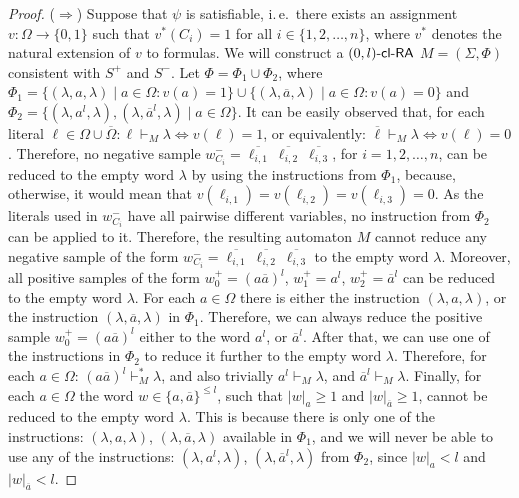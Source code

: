 \begin{proof}
($\Rightarrow$)
Suppose that $\psi$ is satisfiable, i.\,e.\ there exists an assignment $v: \Omega \to \{0, 1\}$ such that $v^*(C_i) = 1$ for all $i \in \{1, 2, \ldots, n\}$, where $v^*$ denotes the natural extension of $v$ to formulas. We will construct a $\textup{\sf $(0,l)$-\textup{\sf cl-RA\/}}$ $M = (\Sigma, \Phi)$ consistent with $S^+$ and $S^-$. Let $\Phi=\Phi_1 \cup \Phi_2$, where $\Phi_1 = \{ (\lambda, a, \lambda) \mid a \in \Omega: v(a) = 1 \} \cup \{ (\lambda, \overline{a}, \lambda) \mid a \in \Omega: v(a) = 0 \}$ and $\Phi_2 = \{ (\lambda, a^l, \lambda), (\lambda, \overline{a}^l, \lambda) \mid a \in \Omega \}$. It can be easily observed that, for each literal $\ell \in \Omega \cup \overline{\Omega}: \ell \vdash_M \lambda \Leftrightarrow v(\ell) = 1$, or equivalently: $\overline{\ell} \vdash_M \lambda \Leftrightarrow v(\ell) = 0$. Therefore, no negative sample $w_{C_i}^- = \overline{\ell_{i,1}}\ \overline{\ell_{i,2}}\ \overline{\ell_{i,3}}$, for $i = 1, 2, \ldots, n$, can be reduced to the empty word $\lambda$ by using the instructions from $\Phi_1$, because, otherwise, it would mean that $v(\ell_{i,1}) = v(\ell_{i,2}) = v(\ell_{i,3}) = 0$. As the literals used in $w_{C_i}^-$ have all pairwise different variables, no instruction from $\Phi_2$ can be applied to it. Therefore, the resulting automaton $M$ cannot reduce any negative sample of the form  $w_{C_i}^- = \overline{\ell_{i,1}}\ \overline{\ell_{i,2}}\ \overline{\ell_{i,3}}$ to the empty word $\lambda$. Moreover, all positive samples of the form $w_0^+ = (a \overline{a})^l$,  $w_1^+ = a^l$, $w_2^+ = \overline{a}^l$ can be reduced to the empty word $\lambda$. For each $a \in \Omega$ there is either the instruction $(\lambda, a, \lambda)$, or the instruction $(\lambda, \overline{a}, \lambda)$ in $\Phi_1$. Therefore, we can always reduce the positive sample $w_0^+ = (a \overline{a})^l$ either to the word $a^l$, or $\overline{a}^l$. After that, we can use one of the instructions in $\Phi_2$ to reduce it further to the empty word $\lambda$. Therefore, for each $a \in \Omega$: $(a \overline{a})^l \vdash_M^* \lambda$, and also trivially $a^l \vdash_M \lambda$, and $\overline{a}^l \vdash_M \lambda$. Finally, for each $a \in \Omega$ the word $w \in \{a, \overline{a}\}^{\le l}$, such that $|w|_a \ge 1$ and $|w|_{\overline{a}} \ge 1$, cannot be reduced to the empty word $\lambda$. This is because there is only one of the instructions: $(\lambda, a, \lambda)$, $(\lambda, \overline{a}, \lambda)$ available in $\Phi_1$, and we will never be able to use any of the instructions: $(\lambda, a^l, \lambda)$, $(\lambda, \overline{a}^l, \lambda)$ from $\Phi_2$, since $|w|_a < l$ and $|w|_{\overline{a}} < l$.


\end{proof}
